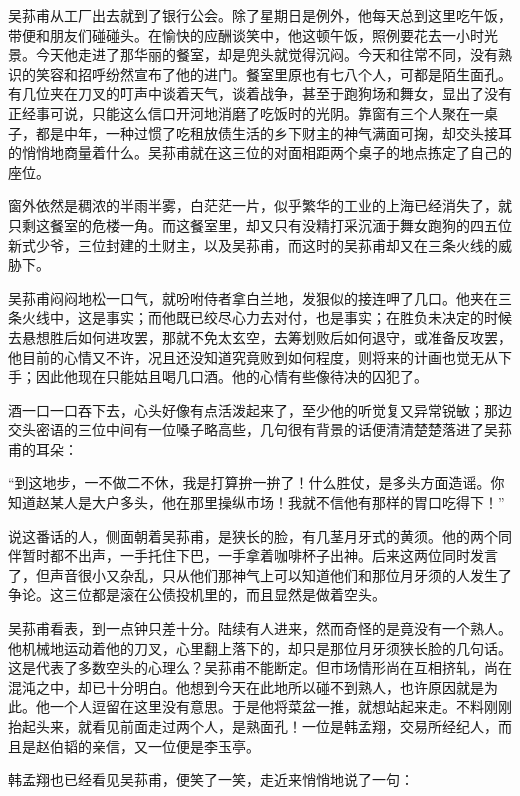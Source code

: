 \par 吴荪甫从工厂出去就到了银行公会。除了星期日是例外，他每天总到这里吃午饭，带便和朋友们碰碰头。在愉快的应酬谈笑中，他这顿午饭，照例要花去一小时光景。今天他走进了那华丽的餐室，却是兜头就觉得沉闷。今天和往常不同，没有熟识的笑容和招呼纷然宣布了他的进门。餐室里原也有七八个人，可都是陌生面孔。有几位夹在刀叉的叮声中谈着天气，谈着战争，甚至于跑狗场和舞女，显出了没有正经事可说，只能这么信口开河地消磨了吃饭时的光阴。靠窗有三个人聚在一桌子，都是中年，一种过惯了吃租放债生活的乡下财主的神气满面可掬，却交头接耳的悄悄地商量着什么。吴荪甫就在这三位的对面相距两个桌子的地点拣定了自己的座位。
\par 窗外依然是稠浓的半雨半雾，白茫茫一片，似乎繁华的工业的上海已经消失了，就只剩这餐室的危楼一角。而这餐室里，却又只有没精打采沉湎于舞女跑狗的四五位新式少爷，三位封建的土财主，以及吴荪甫，而这时的吴荪甫却又在三条火线的威胁下。
\par 吴荪甫闷闷地松一口气，就吩咐侍者拿白兰地，发狠似的接连呷了几口。他夹在三条火线中，这是事实；而他既已绞尽心力去对付，也是事实；在胜负未决定的时候去悬想胜后如何进攻罢，那就不免太玄空，去筹划败后如何退守，或准备反攻罢，他目前的心情又不许，况且还没知道究竟败到如何程度，则将来的计画也觉无从下手；因此他现在只能姑且喝几口酒。他的心情有些像待决的囚犯了。
\par 酒一口一口吞下去，心头好像有点活泼起来了，至少他的听觉复又异常锐敏；那边交头密语的三位中间有一位嗓子略高些，几句很有背景的话便清清楚楚落进了吴荪甫的耳朵：
\par “到这地步，一不做二不休，我是打算拚一拚了！什么胜仗，是多头方面造谣。你知道赵某人是大户多头，他在那里操纵市场！我就不信他有那样的胃口吃得下！”
\par 说这番话的人，侧面朝着吴荪甫，是狭长的脸，有几茎月牙式的黄须。他的两个同伴暂时都不出声，一手托住下巴，一手拿着咖啡杯子出神。后来这两位同时发言了，但声音很小又杂乱，只从他们那神气上可以知道他们和那位月牙须的人发生了争论。这三位都是滚在公债投机里的，而且显然是做着空头。
\par 吴荪甫看表，到一点钟只差十分。陆续有人进来，然而奇怪的是竟没有一个熟人。他机械地运动着他的刀叉，心里翻上落下的，却只是那位月牙须狭长脸的几句话。这是代表了多数空头的心理么？吴荪甫不能断定。但市场情形尚在互相挤轧，尚在混沌之中，却已十分明白。他想到今天在此地所以碰不到熟人，也许原因就是为此。他一个人逗留在这里没有意思。于是他将菜盆一推，就想站起来走。不料刚刚抬起头来，就看见前面走过两个人，是熟面孔！一位是韩孟翔，交易所经纪人，而且是赵伯韬的亲信，又一位便是李玉亭。
\par 韩孟翔也已经看见吴荪甫，便笑了一笑，走近来悄悄地说了一句：
